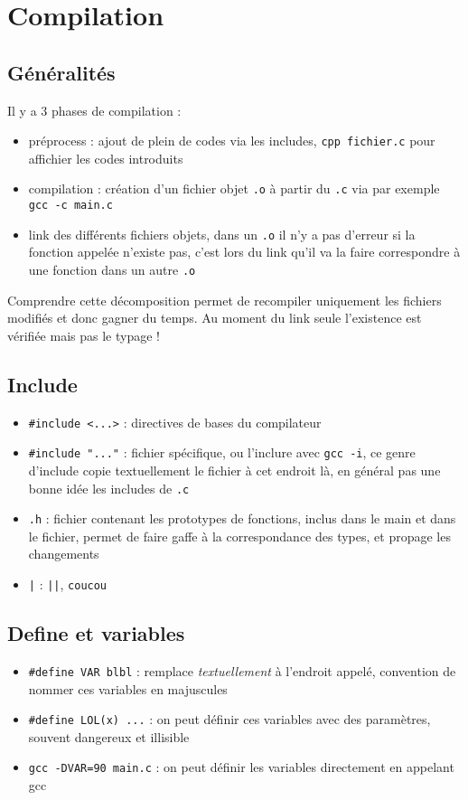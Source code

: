 \newpage
\section{Compilation}

\subsection{Généralités}
\ni
Il y a 3 phases de compilation :
\begin{itemize}
    \item préprocess : ajout de plein de codes via les includes, \verb|cpp fichier.c| pour affichier les codes introduits
    \item compilation : création d'un fichier objet \verb|.o| à partir du \verb|.c| via par exemple \verb|gcc -c main.c|
    \item link des différents fichiers objets, dans un \verb|.o| il n'y a pas d'erreur si la fonction appelée n'existe pas, c'est lors du link qu'il va la faire correspondre à une fonction dans un autre \verb|.o|
\end{itemize}
Comprendre cette décomposition permet de recompiler uniquement les fichiers modifiés et donc gagner du temps. Au moment du link seule l'existence est vérifiée mais pas le typage !

\subsection{Include}
\begin{itemize}
    \item \verb|#include <...>| : directives de bases du compilateur
    \item \verb|#include "..."| : fichier spécifique, ou l'inclure avec \verb|gcc -i|, ce genre d'include copie textuellement le fichier à cet endroit là, en général pas une bonne idée les includes de \verb|.c|
    \item \verb|.h| : fichier contenant les prototypes de fonctions, inclus dans le main et dans le fichier, permet de faire gaffe à la correspondance des types, et propage les changements
    \item \verb!|! : \verb!||!, \verb|coucou|
\end{itemize}

\subsection{Define et variables}
\begin{itemize}
    \item \verb|#define VAR blbl| : remplace \emph{textuellement} à l'endroit appelé, convention de nommer ces variables en majuscules
    \item \verb|#define LOL(x) ...| : on peut définir ces variables avec des paramètres, souvent dangereux et illisible
    \item \verb|gcc -DVAR=90 main.c| : on peut définir les variables directement en appelant gcc
\end{itemize}


